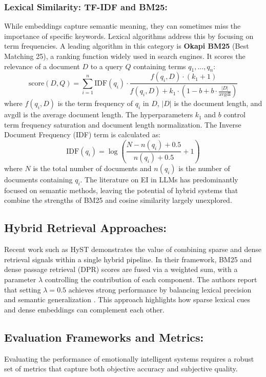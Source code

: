 \subsubsection{Lexical Similarity: TF-IDF and BM25:} 
While embeddings capture semantic meaning, they can sometimes miss the importance of specific keywords. Lexical algorithms address this by focusing on term frequencies. A leading algorithm in this category is \textbf{Okapi BM25} (Best Matching 25), a ranking function widely used in search engines. It scores the relevance of a document $D$ to a query $Q$ containing terms $q_1, ..., q_n$:
\begin{equation}
\text{score}(D, Q) = \sum_{i=1}^{n} \text{IDF}(q_i) \cdot \frac{f(q_i, D) \cdot (k_1 + 1)}{f(q_i, D) + k_1 \cdot \left(1 - b + b \cdot \frac{|D|}{\text{avgdl}}\right)}
\end{equation}
where $f(q_i, D)$ is the term frequency of $q_i$ in $D$, $|D|$ is the document length, and avgdl is the average document length. The hyperparameters $k_1$ and $b$ control term frequency saturation and document length normalization. The Inverse Document Frequency (IDF) term is calculated as:
\begin{equation}
\text{IDF}(q_i) = \log\left(\frac{N - n(q_i) + 0.5}{n(q_i) + 0.5} + 1\right)
\end{equation}
where $N$ is the total number of documents and $n(q_i)$ is the number of documents containing $q_i$. The literature on EI in LLMs has predominantly focused on semantic methods, leaving the potential of hybrid systems that combine the strengths of BM25 and cosine similarity largely unexplored.

\subsection{Hybrid Retrieval Approaches:} 
Recent work such as HyST demonstrates the value of combining sparse and dense retrieval signals within a single hybrid pipeline. In their framework, BM25 and dense passage retrieval (DPR) scores are fused via a weighted sum, with a parameter $\lambda$ controlling the contribution of each component. The authors report that setting $\lambda=0.5$ achieves strong performance by balancing lexical precision and semantic generalization \cite{hyst2025}. This approach highlights how sparse lexical cues and dense embeddings can complement each other.

\subsection{Evaluation Frameworks and Metrics:} 
Evaluating the performance of emotionally intelligent systems requires a robust set of metrics that capture both objective accuracy and subjective quality.

